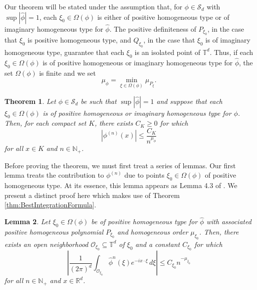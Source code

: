 \documentclass[11pt]{article}
\newtheorem{theorem}{Theorem}[section]
\newtheorem{lemma}[theorem]{Lemma}
\begin{document}
Our theorem will be stated under the assumption that, for $\phi\in\mathcal{S}_d$ with $\sup|\widehat{\phi}|=1$, each $\xi_0\in\Omega(\phi)$ is either of positive homogeneous type or of imaginary homogeneous type for $\widehat\phi$. The positive definiteness of $P_{\xi_0}$, in the case that $\xi_0$ is positive homogeneous type, and $Q_{\xi_0}$, in the case that $\xi_0$ is of imaginary homogeneous type, guarantee that each $\xi_0$ is an isolated point of $\mathbb{T}^d$. Thus, if each $\xi_0\in\Omega(\phi)$ is of positive homogeneous or imaginary homogeneous type for $\widehat{\phi}$, the set $\Omega(\phi)$ is finite and we set
\begin{equation*}
    \mu_{\phi}=\min_{\xi\in\Omega(\phi)}\mu_{P_\xi}.
\end{equation*}

\begin{theorem}
Let $\phi\in\mathcal{S}_d$ be such that $\sup |\widehat{\phi}|=1$ and suppose that each $\xi_0\in\Omega(\phi)$ is of positive homogeneous or imaginary homogeneous type for $\phi$. Then, for each compact set $K$, there exists $C_K\geq 0$ for which
\begin{equation*}
    \left|\phi^{(n)}(x)\right|\leq\frac{C_K}{n^{\mu_\phi}}
\end{equation*}
for all $x\in K$ and $n\in\mathbb{N}_+$.
\end{theorem}
\noindent Before proving the theorem, we must first treat a series of lemmas. Our first lemma treats the contribution to $\phi^{(n)}$ due to points $\xi_0\in \Omega(\phi)$ of positive homogeneous type. At its essence, this lemma appears as Lemma 4.3 of \cite{Randles2017}. We present a distinct proof here which makes use of Theorem \ref{thm:BestIntegrationFormula}.
\begin{lemma}\label{lem:EstPosHom}
Let $\xi_0\in\Omega(\phi)$ be of positive homogeneous type for $\widehat{\phi}$ with associated positive homogeneous polynomial $P_{\xi_0}$ and homogeneous order $\mu_{\xi_0}$. Then, there exists an open neighborhood $\mathcal{O}_{\xi_0}\subseteq\mathbb{T}^d$ of $\xi_0$ and a constant $C_{\xi_0}$ for which
\begin{equation*}
    \left|\frac{1}{(2\pi)^d}\int_{\mathcal{O}_{\xi_0}}\widehat{\phi}^n(\xi)e^{-ix\cdot\xi}\,d\xi\right|\leq %
    C_{\xi_0} n^{-\mu_{\xi_0}}
\end{equation*}
for all $n\in\mathbb{N}_+$ and $x\in\mathbb{R}^d$.
\end{lemma}
\end{document}
